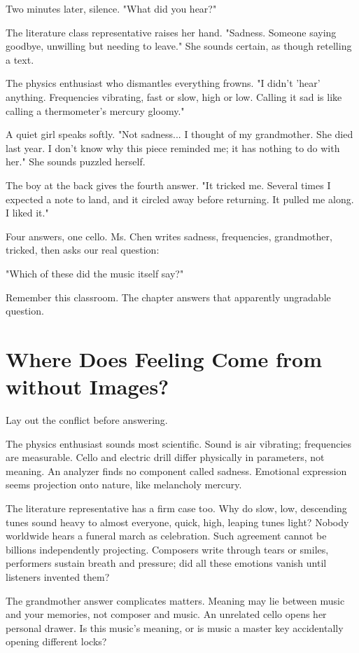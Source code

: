Two minutes later, silence. "What did you hear?"

The literature class representative raises her hand. "Sadness. Someone saying goodbye, unwilling but needing to leave." She sounds certain, as though retelling a text.

The physics enthusiast who dismantles everything frowns. "I didn't 'hear' anything. Frequencies vibrating, fast or slow, high or low. Calling it sad is like calling a thermometer's mercury gloomy."

A quiet girl speaks softly. "Not sadness... I thought of my grandmother. She died last year. I don't know why this piece reminded me; it has nothing to do with her." She sounds puzzled herself.

The boy at the back gives the fourth answer. "It tricked me. Several times I expected a note to land, and it circled away before returning. It pulled me along. I liked it."

Four answers, one cello. Ms. Chen writes sadness, frequencies, grandmother, tricked, then asks our real question:

"Which of these did the music itself say?"

Remember this classroom. The chapter answers that apparently ungradable question.

\section[How Can Sound Produce Feeling?]{Where Does Feeling Come from without Images?}
Lay out the conflict before answering.

The physics enthusiast sounds most scientific. Sound is air vibrating; frequencies are measurable. Cello and electric drill differ physically in parameters, not meaning. An analyzer finds no component called sadness. Emotional expression seems projection onto nature, like melancholy mercury.

The literature representative has a firm case too. Why do slow, low, descending tunes sound heavy to almost everyone, quick, high, leaping tunes light? Nobody worldwide hears a funeral march as celebration. Such agreement cannot be billions independently projecting. Composers write through tears or smiles, performers sustain breath and pressure; did all these emotions vanish until listeners invented them?

The grandmother answer complicates matters. Meaning may lie between music and your memories, not composer and music. An unrelated cello opens her personal drawer. Is this music's meaning, or is music a master key accidentally opening different locks?

